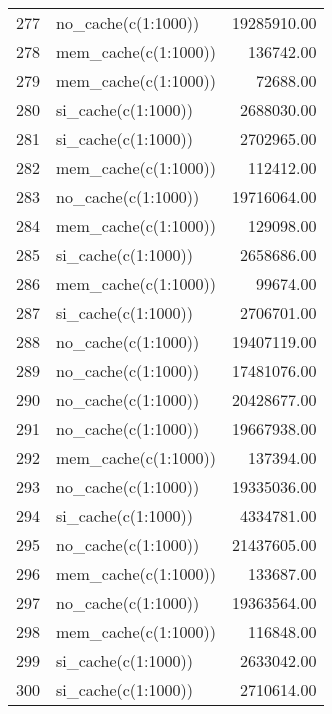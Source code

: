 \begin{table}[ht]
\begin{tabular}{rlr}
  277 & no\_cache(c(1:1000)) & 19285910.00 \\ 
  278 & mem\_cache(c(1:1000)) & 136742.00 \\ 
  279 & mem\_cache(c(1:1000)) & 72688.00 \\ 
  280 & si\_cache(c(1:1000)) & 2688030.00 \\ 
  281 & si\_cache(c(1:1000)) & 2702965.00 \\ 
  282 & mem\_cache(c(1:1000)) & 112412.00 \\ 
  283 & no\_cache(c(1:1000)) & 19716064.00 \\ 
  284 & mem\_cache(c(1:1000)) & 129098.00 \\ 
  285 & si\_cache(c(1:1000)) & 2658686.00 \\ 
  286 & mem\_cache(c(1:1000)) & 99674.00 \\ 
  287 & si\_cache(c(1:1000)) & 2706701.00 \\ 
  288 & no\_cache(c(1:1000)) & 19407119.00 \\ 
  289 & no\_cache(c(1:1000)) & 17481076.00 \\ 
  290 & no\_cache(c(1:1000)) & 20428677.00 \\ 
  291 & no\_cache(c(1:1000)) & 19667938.00 \\ 
  292 & mem\_cache(c(1:1000)) & 137394.00 \\ 
  293 & no\_cache(c(1:1000)) & 19335036.00 \\ 
  294 & si\_cache(c(1:1000)) & 4334781.00 \\ 
  295 & no\_cache(c(1:1000)) & 21437605.00 \\ 
  296 & mem\_cache(c(1:1000)) & 133687.00 \\ 
  297 & no\_cache(c(1:1000)) & 19363564.00 \\ 
  298 & mem\_cache(c(1:1000)) & 116848.00 \\ 
  299 & si\_cache(c(1:1000)) & 2633042.00 \\ 
  300 & si\_cache(c(1:1000)) & 2710614.00 \\ 
   \hline
\end{tabular}
\end{table}
